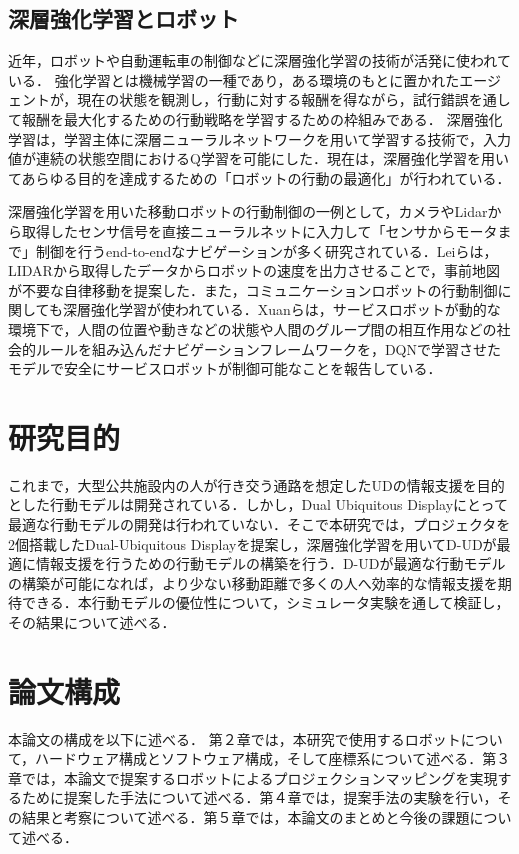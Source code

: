 \documentclass[12pt]{sonota/aislab}
\begin{document}
\subsection{深層強化学習とロボット}
近年，ロボットや自動運転車の制御などに深層強化学習の技術が活発に使われている．
強化学習とは機械学習の一種であり，ある環境のもとに置かれたエージェントが，現在の状態を観測し，行動に対する報酬を得ながら，試行錯誤を通して報酬を最大化するための行動戦略を学習するための枠組みである\cite{RL}．
深層強化学習は，学習主体に深層ニューラルネットワークを用いて学習する技術で，入力値が連続の状態空間におけるQ学習を可能にした\cite{drl}．現在は，深層強化学習を用いてあらゆる目的を達成するための「ロボットの行動の最適化」が行われている\cite{Human_level_dqn}\cite{sarl}．

深層強化学習を用いた移動ロボットの行動制御の一例として，カメラやLidarから取得したセンサ信号を直接ニューラルネットに入力して「センサからモータまで」制御を行うend-to-endなナビゲーションが多く研究されている\cite{ete}\cite{Self}\cite{vtr}．Leiらは，LIDARから取得したデータからロボットの速度を出力させることで，事前地図が不要な自律移動を提案した\cite{vtr}．また，コミュニケーションロボットの行動制御に関しても深層強化学習が使われている．Xuanらは，サービスロボットが動的な環境下で，人間の位置や動きなどの状態や人間のグループ間の相互作用などの社会的ルールを組み込んだナビゲーションフレームワーク\cite{human_navigation}を，DQNで学習させたモデルで安全にサービスロボットが制御可能なことを報告している\cite{human_navigation_dqn}．

\section{研究目的}
これまで，大型公共施設内の人が行き交う通路を想定したUDの情報支援を目的とした行動モデルは開発されている．しかし，Dual Ubiquitous Displayにとって最適な行動モデルの開発は行われていない．そこで本研究では，プロジェクタを2個搭載したDual-Ubiquitous Displayを提案し，深層強化学習を用いてD-UDが最適に情報支援を行うための行動モデルの構築を行う．D-UDが最適な行動モデルの構築が可能になれば，より少ない移動距離で多くの人へ効率的な情報支援を期待できる．本行動モデルの優位性について，シミュレータ実験を通して検証し，その結果について述べる．

\section{論文構成}
本論文の構成を以下に述べる．
第２章では，本研究で使用するロボットについて，ハードウェア構成とソフトウェア構成，そして座標系について述べる．第３章では，本論文で提案するロボットによるプロジェクションマッピングを実現するために提案した手法について述べる．第４章では，提案手法の実験を行い，その結果と考察について述べる．第５章では，本論文のまとめと今後の課題について述べる．
\end{document}
